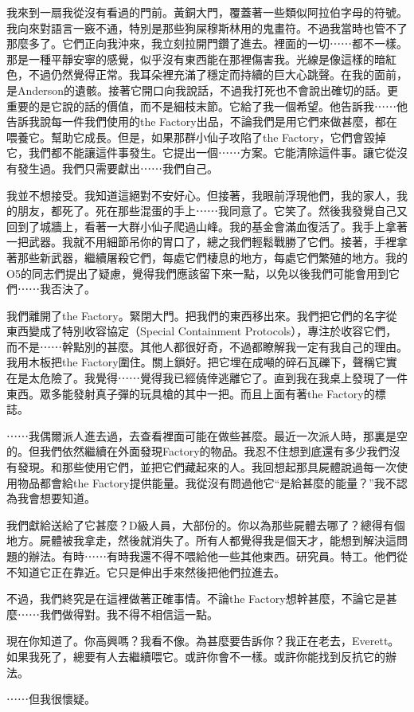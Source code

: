 我來到一扇我從沒有看過的門前。黃銅大門，覆蓋著一些類似阿拉伯字母的符號。我向來對語言一竅不通，特別是那些狗屎穆斯林用的鬼畫符。不過我當時也管不了那麼多了。它們正向我沖來，我立刻拉開門鑽了進去。裡面的一切⋯⋯都不一樣。那是一種平靜安寧的感覺，似乎沒有東西能在那裡傷害我。光線是像這樣的暗紅色，不過仍然覺得正常。我耳朵裡充滿了穩定而持續的巨大心跳聲。在我的面前，是Anderson的遺骸。接著它開口向我說話，不過我打死也不會說出確切的話。更重要的是它說的話的價值，而不是細枝末節。它給了我一個希望。他告訴我⋯⋯他告訴我說每一件我們使用的the Factory出品，不論我們是用它們來做甚麼，都在喂養它。幫助它成長。但是，如果那群小仙子攻陷了the Factory，它們會毀掉它，我們都不能讓這件事發生。它提出一個⋯⋯方案。它能清除這件事。讓它從沒有發生過。我們只需要獻出⋯⋯我們自己。

我並不想接受。我知道這絕對不安好心。但接著，我眼前浮現他們，我的家人，我的朋友，都死了。死在那些混蛋的手上⋯⋯我同意了。它笑了。然後我發覺自己又回到了城牆上，看著一大群小仙子爬過山峰。我的基金會滿血復活了。我手上拿著一把武器。我就不用細節吊你的胃口了，總之我們輕鬆戰勝了它們。接著，手裡拿著那些新武器，繼續屠殺它們，每處它們棲息的地方，每處它們繁殖的地方。我的O5的同志們提出了疑慮，覺得我們應該留下來一點，以免以後我們可能會用到它們⋯⋯我否決了。

我們離開了the Factory。緊閉大門。把我們的東西移出來。我們把它們的名字從東西變成了特別收容協定（Special Containment Protocols），專注於收容它們，而不是⋯⋯幹點別的甚麼。其他人都很好奇，不過都瞭解我一定有我自己的理由。我用木板把the Factory圍住。關上鎖好。把它埋在成噸的碎石瓦礫下，聲稱它實在是太危險了。我覺得⋯⋯覺得我已經僥倖逃離它了。直到我在我桌上發現了一件東西。眾多能發射真子彈的玩具槍的其中一把。而且上面有著the Factory的標誌。

⋯⋯我偶爾派人進去過，去查看裡面可能在做些甚麼。最近一次派人時，那裏是空的。但我們依然繼續在外面發現Factory的物品。我忍不住想到底還有多少我們沒有發現。和那些使用它們，並把它們藏起來的人。我回想起那具屍體說過每一次使用物品都會給the Factory提供能量。我從沒有問過他它“是給甚麼的能量？”我不認為我會想要知道。

我們獻給送給了它甚麼？D級人員，大部份的。你以為那些屍體去哪了？總得有個地方。屍體被我拿走，然後就消失了。所有人都覺得我是個天才，能想到解決這問題的辦法。有時⋯⋯有時我還不得不喂給他一些其他東西。研究員。特工。他們從不知道它正在靠近。它只是伸出手來然後把他們拉進去。

不過，我們終究是在這裡做著正確事情。不論the Factory想幹甚麼，不論它是甚麼⋯⋯我們做得對。我不得不相信這一點。

現在你知道了。你高興嗎？我看不像。為甚麼要告訴你？我正在老去，Everett。如果我死了，總要有人去繼續喂它。或許你會不一樣。或許你能找到反抗它的辦法。

⋯⋯但我很懷疑。
